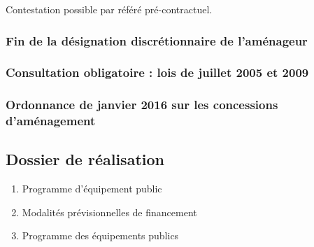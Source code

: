 		Contestation possible par référé pré-contractuel. \lips

		\subsubsection{Fin de la désignation discrétionnaire de l'aménageur}

		\subsubsection{Consultation obligatoire : lois de juillet 2005 et 2009}

		\subsubsection{Ordonnance de janvier 2016 sur les concessions d'aménagement}

	\subsection{Dossier de réalisation}

		\begin{enumerate}
			\item Programme d'équipement public
			\item Modalités prévisionnelles de financement
			\item Programme des équipements publics
		\end{enumerate}
		
